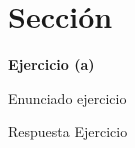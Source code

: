 \documentclass[a4paper,12pt]{article}
\newenvironment{exercise}[1]%
{%
  \par\vspace{\baselineskip}\noindent
  \textbf{Ejercicio (#1)}\begin{itshape}%
  \par\vspace{\baselineskip}\noindent\ignorespaces
}%
{%
  \end{itshape}\ignorespacesafterend
}
\begin{document}
\pagebreak
\tableofcontents
\pagebreak


\section{Sección}

\begin{exercise}{a}

Enunciado ejercicio

\end{exercise}

\bigskip

Respuesta Ejercicio
\end{document}
